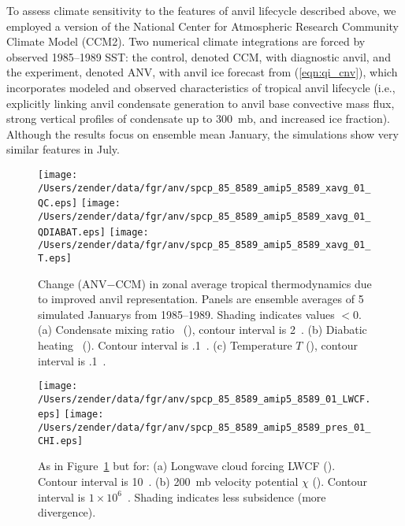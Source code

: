 \documentclass[twocolumn,twoside,final,10pt]{article}
\begin{document}
\label{sec:dsc}

To assess climate sensitivity to the features of anvil lifecycle
described above, we employed a version of the National Center for
Atmospheric Research Community Climate Model (CCM2). 
Two numerical climate integrations are forced by observed 1985--1989
SST: the control, denoted CCM, with diagnostic anvil, and the 
experiment, denoted ANV, with anvil ice forecast from
(\ref{eqn:qi_cnv}), which incorporates modeled and observed
characteristics of tropical anvil lifecycle (i.e., explicitly linking
anvil condensate generation to anvil base convective mass flux,
strong vertical profiles of condensate up to 300~mb, and increased ice
fraction).
Although the results focus on ensemble mean January, the simulations
show very similar features in July.

\begin{figure}
\begin{center}
\texttt{[image: /Users/zender/data/fgr/anv/spcp\_85\_8589\_amip5\_8589\_xavg\_01\_QC.eps]}\vfill
\texttt{[image: /Users/zender/data/fgr/anv/spcp\_85\_8589\_amip5\_8589\_xavg\_01\_QDIABAT.eps]}\vfill
\texttt{[image: /Users/zender/data/fgr/anv/spcp\_85\_8589\_amip5\_8589\_xavg\_01\_T.eps]}\vfill
\end{center}
\caption{
Change (ANV$-$CCM) in zonal average tropical thermodynamics due to
improved anvil representation.
Panels are ensemble averages of 5 simulated Januarys from 1985--1989.
Shading indicates values $< 0$.
(a) Condensate mixing ratio \qc\ (\mgxkg), contour interval is
2~\mgxkg.
(b) Diabatic heating \QT\ (\kxday). Contour interval is .1~\kxday.  
(c) Temperature $T$ (\dgrk), contour interval is .1~\dgrk.
\label{fig:xavg_8589}}   
\end{figure}

\begin{figure}
\begin{center}
\texttt{[image: /Users/zender/data/fgr/anv/spcp\_85\_8589\_amip5\_8589\_01\_LWCF.eps]}\vfill
\texttt{[image: /Users/zender/data/fgr/anv/spcp\_85\_8589\_amip5\_8589\_pres\_01\_CHI.eps]}\vfill
\end{center}
\caption{
As in Figure~\ref{fig:xavg_8589} but for:
(a) Longwave cloud forcing LWCF (\wxmS). Contour interval is 10~\wxmS.
(b) 200~mb velocity potential $\chi$ (\mSxs). Contour interval is $1
\times 10^6$~\mSxs.  Shading indicates less subsidence (more
divergence). 
\label{fig:8589}}   
\end{figure}
\end{document}
